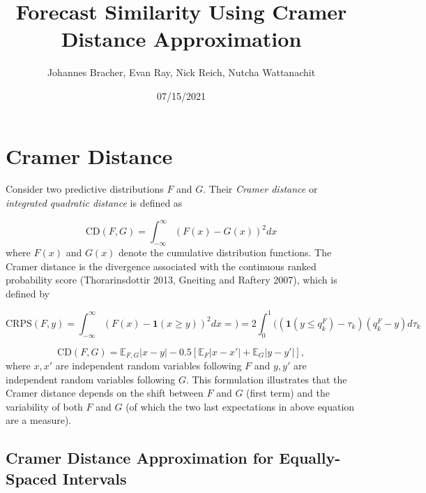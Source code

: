 \documentclass[
]{article}
\title{Forecast Similarity Using Cramer Distance Approximation}
\author{Johannes Bracher, Evan Ray, Nick Reich, Nutcha Wattanachit}
\date{07/15/2021}
\begin{document}
\maketitle

\hypertarget{cramer-distance}{%
\section{Cramer Distance}\label{cramer-distance}}

Consider two predictive distributions \(F\) and \(G\). Their
\emph{Cramer distance} or \emph{integrated quadratic distance} is
defined as

\[
\text{CD}(F, G) = \int_{-\infty}^\infty(F(x) - G(x))^2 dx
\] where \(F(x)\) and \(G(x)\) denote the cumulative distribution
functions. The Cramer distance is the divergence associated with the
continuous ranked probability score (Thorarinsdottir 2013, Gneiting and
Raftery 2007), which is defined by

\begin{equation}
\text{CRPS}(F, y) = \int_{-\infty}^\infty(F(x) - \mathbf{1}(x \geq y))^2 dx = ) = 2\int_0^1((\mathbf{1}(y \leq q^F_k)-\tau_k)(q^F_k-y) d\tau_k \label{eq:crps}
\end{equation}

\begin{equation}
\text{CD}(F, G) = \mathbb{E}_{F, G}|x - y| - 0.5 \left[\mathbb{E}_F|x - x'| + \mathbb{E}_G|y - y'| \right], \label{eq:formulation_expectations}
\end{equation} where \(x, x'\) are independent random variables
following \(F\) and \(y, y'\) are independent random variables following
\(G\). This formulation illustrates that the Cramer distance depends on
the shift between \(F\) and \(G\) (first term) and the variability of
both \(F\) and \(G\) (of which the two last expectations in above
equation are a measure).

\hypertarget{cramer-distance-approximation-for-equally-spaced-intervals}{%
\subsection{Cramer Distance Approximation for Equally-Spaced
Intervals}\label{cramer-distance-approximation-for-equally-spaced-intervals}}
\end{document}
